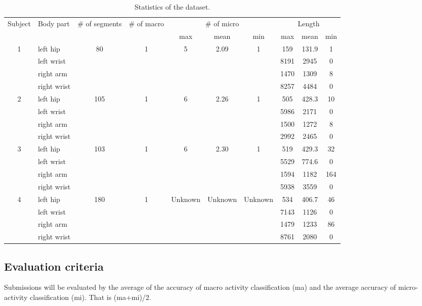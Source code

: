 \documentclass{svmult}
\begin{document}
\begin{table}[h]
    \centering
    \caption{Statistics of the dataset.}
    \begin{tabular}{c|l|c|c|c|c|c|c|c|c}\hline\hline
        Subject &Body part& \# of segments &\# of macro& \multicolumn{3}{c|}{\# of micro}& \multicolumn{3}{c}{Length}  \\
         &&&&max&mean&min&max&mean&min\\\hline
        \multirow{4}{*}{1} & left hip& \multirow{4}{*}{80} &\multirow{4}{*}{1}&\multirow{4}{*}{5}&\multirow{4}{*}{2.09}&\multirow{4}{*}{1}  &159&131.9&1 \\
          & left wrist&&&&&&8191&2945&0\\
          & right arm&&&&&&1470&1309&8\\
          & right wrist&&&&&&8257&4484&0\\\hline
        \multirow{4}{*}{2}& left hip& \multirow{4}{*}{105}&\multirow{4}{*}{1}&\multirow{4}{*}{6}&\multirow{4}{*}{2.26}&\multirow{4}{*}{1}&505&428.3&10   \\
          & left wrist&&&&&&5986&2171&0\\
          & right arm&&&&&&1500&1272&8\\
          & right wrist&&&&&&2992&2465&0\\\hline
        \multirow{4}{*}{3} & left hip& \multirow{4}{*}{103}&\multirow{4}{*}{1}&\multirow{4}{*}{6}&\multirow{4}{*}{2.30}&\multirow{4}{*}{1}&519&429.3&32  \\
          & left wrist&&&&&&5529&774.6&0\\
          & right arm&&&&&&1594&1182&164\\
          & right wrist&&&&&&5938&3559&0\\\hline
        \multirow{4}{*}{4} & left hip & \multirow{4}{*}{180}&\multirow{4}{*}{1}&\multirow{4}{*}{Unknown}&\multirow{4}{*}{Unknown}&\multirow{4}{*}{Unknown}&534&406.7&46 \\
          & left wrist&&&&&&7143&1126&0\\
          & right arm&&&&&&1479&1233&86\\
          & right wrist&&&&&&8761&2080&0\\\hline
    \end{tabular}
    \label{tab:stats}
\end{table}

\subsection{Evaluation criteria}
Submissions will be evaluated by the average of the accuracy of macro activity classification (ma) and the average accuracy of micro-activity classification (mi). That is (ma+mi)/2.
\end{document}
